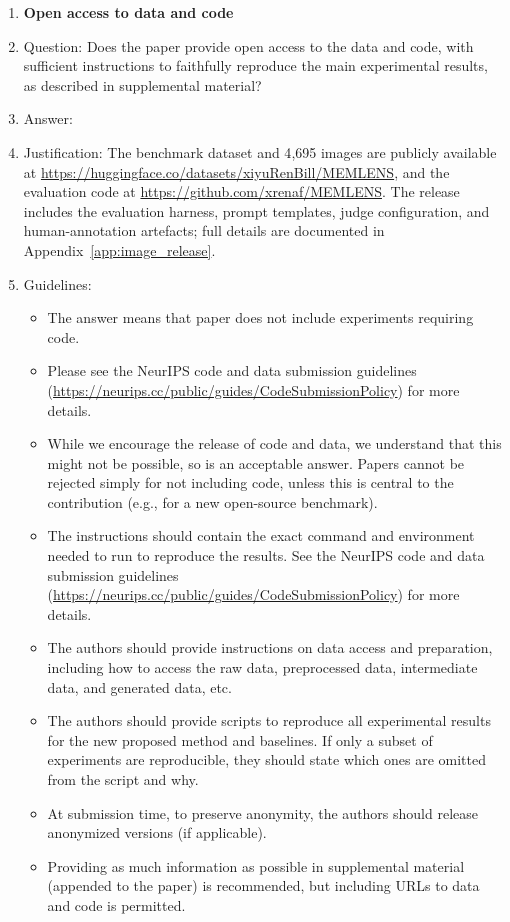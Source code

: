 \documentclass{article}
\begin{document}
\begin{enumerate}
\item {\bf Open access to data and code}
    \item[] Question: Does the paper provide open access to the data and code, with sufficient instructions to faithfully reproduce the main experimental results, as described in supplemental material?
    \item[] Answer: \answerYes{}
    \item[] Justification: The benchmark dataset and 4{,}695 images are publicly available at \url{https://huggingface.co/datasets/xiyuRenBill/MEMLENS}, and the evaluation code at \url{https://github.com/xrenaf/MEMLENS}. The release includes the evaluation harness, prompt templates, judge configuration, and human-annotation artefacts; full details are documented in Appendix~\ref{app:image_release}.
    \item[] Guidelines:
    \begin{itemize}
        \item The answer \answerNA{} means that paper does not include experiments requiring code.
        \item Please see the NeurIPS code and data submission guidelines (\url{https://neurips.cc/public/guides/CodeSubmissionPolicy}) for more details.
        \item While we encourage the release of code and data, we understand that this might not be possible, so \answerNo{} is an acceptable answer. Papers cannot be rejected simply for not including code, unless this is central to the contribution (e.g., for a new open-source benchmark).
        \item The instructions should contain the exact command and environment needed to run to reproduce the results. See the NeurIPS code and data submission guidelines (\url{https://neurips.cc/public/guides/CodeSubmissionPolicy}) for more details.
        \item The authors should provide instructions on data access and preparation, including how to access the raw data, preprocessed data, intermediate data, and generated data, etc.
        \item The authors should provide scripts to reproduce all experimental results for the new proposed method and baselines. If only a subset of experiments are reproducible, they should state which ones are omitted from the script and why.
        \item At submission time, to preserve anonymity, the authors should release anonymized versions (if applicable).
        \item Providing as much information as possible in supplemental material (appended to the paper) is recommended, but including URLs to data and code is permitted.
    \end{itemize}



\end{enumerate}
\end{document}
